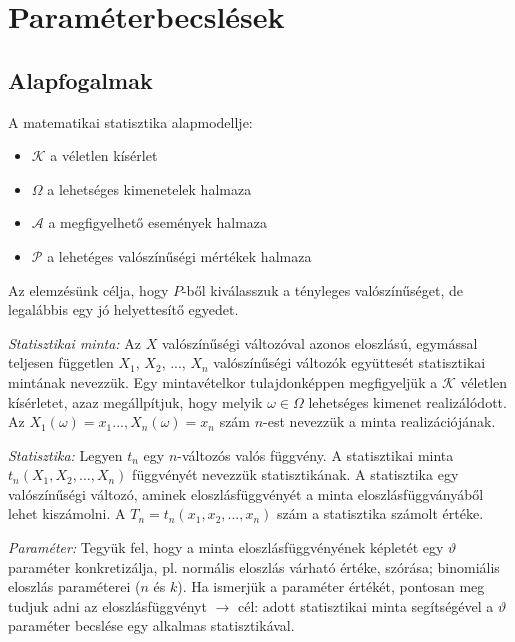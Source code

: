 \chapter{Paraméterbecslések}

\section{Alapfogalmak}

A matematikai statisztika alapmodellje:
\begin{itemize}
\item $\mathcal{K}$ a véletlen kísérlet
\item $\Omega$ a lehetséges kimenetelek halmaza
\item $\mathcal{A}$ a megfigyelhető események halmaza
\item $\mathcal{P}$ a lehetéges valószínűségi mértékek halmaza
\end{itemize}
Az elemzésünk célja, hogy $\mathit{P}$-ből kiválasszuk a tényleges valószínűséget, de legalábbis egy jó helyettesítő egyedet.

\emph{Statisztikai minta:} Az $X$ valószínűségi változóval azonos eloszlású, egymással teljesen független $X_1$, $X_2$, ..., $X_n$ valószínűségi változók együttesét statisztikai mintának nevezzük. Egy mintavételkor tulajdonképpen megfigyeljük a $\mathcal{K}$ véletlen kísérletet, azaz megállpítjuk, hogy melyik $\omega \in \Omega$ lehetséges kimenet realizálódott. Az $X_1(\omega)=x_1..., X_n(\omega)=x_n$ szám $n$-est nevezzük a minta realizációjának.

\emph{Statisztika:} Legyen $t_n$ egy $n$-változós valós függvény. A statisztikai minta $t_n(X_1, X_2, ..., X_n)$ függvényét nevezzük statisztikának. A statisztika egy valószínűségi változó, aminek eloszlásfüggvényét a minta eloszlásfüggványáből lehet kiszámolni. A $T_n = t_n(x_1, x_2, ..., x_n)$ szám a statisztika számolt értéke.

\emph{Paraméter:} Tegyük fel, hogy a minta eloszlásfüggvényének képletét egy $\vartheta$ paraméter konkretizálja, pl. normális eloszlás várható értéke, szórása; binomiális eloszlás paraméterei ($n$ és $k$). Ha ismerjük a paraméter értékét, pontosan meg tudjuk adni az eloszlásfüggvényt $\rightarrow$ cél: adott statisztikai minta segítségével a $\vartheta$ paraméter becslése egy alkalmas statisztikával.

